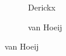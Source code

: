 \begin{frame}[plain,c]
\begin{figure}[h]
\begin{subfigure}{0.09\textwidth}
	\caption{\;\;\scriptsize{Derickx}}
	\end{subfigure} \hfill \phantom{.}
	\begin{subfigure}{0.115\textwidth}
	\captionsetup{labelformat=empty}
	\centering
	\caption{\;\;\tiny{van Hoeij}}
	\end{subfigure} \hfill \phantom{.}
	\end{figure}
\end{frame}





